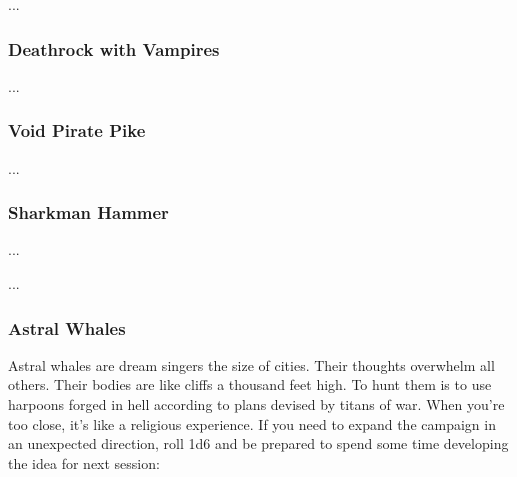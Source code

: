 \documentclass[11pt]{bxart}
\begin{document}
...

\subsubsection{Deathrock with Vampires}

...

\subsubsection{Void Pirate Pike}

...

\subsubsection{Sharkman Hammer}

...

\newpage

...

\newpage

\subsubsection{Astral Whales}

Astral whales are dream singers the size of cities. Their thoughts overwhelm all others. Their bodies are like cliffs a thousand feet high. To hunt them is to use harpoons forged in hell according to plans devised by titans of war. When you're too close, it's like a religious experience. If you need to expand the campaign in an unexpected direction, roll 1d6 and be prepared to spend some time developing the idea for next session:
\end{document}
